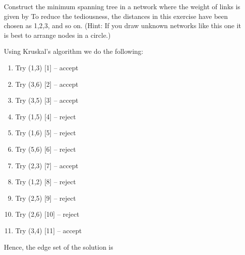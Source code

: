 

Construct the minimum spanning tree in a network where the weight of links is given by
To reduce the tediousness, the distances in this exercise have been chosen as 1,2,3, and so on. (Hint: If you draw unknown networks like this one it is best to arrange nodes in a circle.)


\solution
Using Kruskal's algorithm we do the following:
\begin{enumerate}[label=\arabic*.]
\item Try (1,3) [1] -- accept 
\item Try (3,6) [2] -- accept
\item Try (3,5) [3] -- accept
\item Try (1,5) [4] -- reject
\item Try (1,6) [5] -- reject
\item Try (5,6) [6] -- reject
\item Try (2,3) [7] -- accept
\item Try (1,2) [8] -- reject
\item Try (2,5) [9] -- reject
\item Try (2,6) [10] -- reject
\item Try (3,4) [11] -- accept
\end{enumerate}
Hence, the edge set of the solution is 

